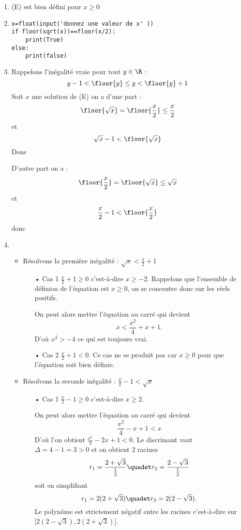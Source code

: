 \documentclass[a4paper, 11pt,reqno]{article}
\begin{document}
\begin{correction}
\begin{enumerate}
\item (E) est bien défini pour $x\geq 0$
\item \begin{lstlisting}
x=float(input('donnez une valeur de x' ))
if floor(sqrt(x))==floor(x/2):
	print(True)
else:
	print(false)
\end{lstlisting}
\item Rappelons l'inégalité vraie pour tout $y\in \R$ :
$$y-1<\floor{y} \leq y <\floor{y}+1$$
 Soit $x$ une solution de (E) on a d'une part : 
$$\floor{\sqrt{x}}=\floor{\frac{x}{2}} \leq \frac{x}{2}$$
et 
$$\sqrt{x}-1< \floor{\sqrt{x}}$$
Donc 



D'autre part on  a : 
$$\floor{\frac{x}{2}}=\floor{\sqrt{x}}\leq \sqrt{x}$$
et $$\frac{x}{2}-1<\floor{\frac{x}{2}}$$
donc 

\item 
\begin{itemize}


\item Résolvons la première inégalité : $\sqrt{x}<\frac{x}{2}+1$

\begin{itemize}
\item[•] Cas 1 $\frac{x}{2}+1\geq 0$ c'est-à-dire $x\geq -2$. Rappelons que l'ensemble de définion de l'équation est $x\geq 0$, on se concentre donc sur les réels positifs. 

On peut alors mettre l'équation au carré qui devient 
$$x < \frac{x^2}{4} +x+1.$$
D'où $x^2>-4$ ce qui est toujours vrai. 
\item[•] Cas 2 $\frac{x}{2}+1< 0$. Ce cas ne se produit pas car $x\geq 0$ pour que l'équation soit bien définie. 
\end{itemize}


\item Résolvons la seconde inégalité : $\frac{x}{2}-1<\sqrt{x}$

\begin{itemize}
\item[•] Cas 1 $\frac{x}{2}-1\geq 0$ c'est-à-dire $x\geq 2$. 

On peut alors mettre l'équation au carré qui devient 
$$ \frac{x^2}{4} -x+1<x$$
D'où l'on obtient $\frac{x^2}{4} -2x+1<0$. 
Le discrimant vaut $\Delta =4-1=3>0$ et on obtient 2 racines 
$$r_1 = \frac{2+\sqrt{3}}{\frac{1}{2}}\quadet r_2 = \frac{2-\sqrt{3}}{\frac{1}{2}}$$
soit en simplifiant 
$$r_1 = 2(2+\sqrt{3})\quadet r_2 = 2(2-\sqrt{3}).$$
Le polynôme est strictement négatif entre les racines c'est-à-dire sur $]2(2-\sqrt{3}),2(2+\sqrt{3})[$.


\end{itemize}
\end{itemize}
\end{enumerate}
\end{correction}
\end{document}
